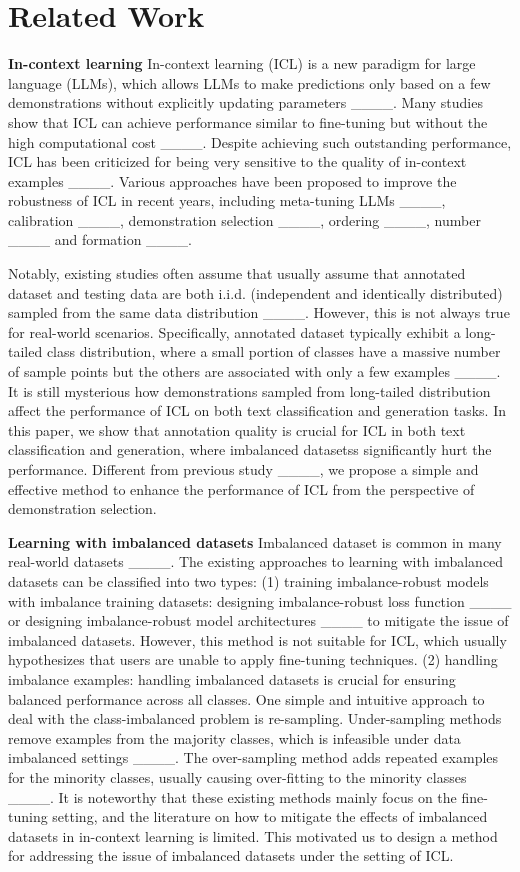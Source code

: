 \section{Related Work}
\textbf{In-context learning} In-context learning (ICL) is a new paradigm for large language (LLMs), which allows LLMs to make predictions only based on a few demonstrations without explicitly updating parameters ____. Many studies show that ICL can achieve performance similar to fine-tuning but without the high computational cost ____. Despite achieving such outstanding performance, ICL has been criticized for being very sensitive to the quality of in-context examples ____. Various approaches have been proposed to improve the robustness of ICL in recent years, including meta-tuning LLMs ____, calibration ____,  demonstration selection ____, ordering ____, number ____ and formation ____.  

Notably, existing studies often assume that usually assume that annotated dataset and testing data are both i.i.d. (independent and identically distributed) sampled from the same data distribution ____. However, this is not always true for real-world scenarios. Specifically, annotated dataset typically exhibit a long-tailed class distribution, where a small portion of classes have a massive number of sample points but the others are associated with only a few examples ____. It is still mysterious how demonstrations sampled from long-tailed distribution affect the performance of ICL on both text classification and generation tasks. In this paper, we show that annotation quality is crucial for ICL in both text classification and generation, where imbalanced datasetss significantly hurt the performance. Different from previous study ____,  we propose a simple and effective method to enhance the performance of ICL from the perspective of demonstration selection.


\textbf{Learning with imbalanced datasets} Imbalanced dataset is common in many real-world datasets ____. 
The existing approaches to learning with imbalanced datasets can be classified into two types: (1) training imbalance-robust models with imbalance training datasets: designing imbalance-robust loss function ____ or designing imbalance-robust model architectures ____ to mitigate the issue of imbalanced datasets. However, this method is not suitable for ICL, which usually hypothesizes that users are unable to apply fine-tuning techniques. (2) handling imbalance examples: handling imbalanced datasets is crucial for ensuring balanced performance across all classes. One simple and intuitive approach to deal with the class-imbalanced problem is re-sampling. Under-sampling methods remove examples from the majority classes, which is infeasible under data imbalanced settings ____. The over-sampling method adds repeated examples for the minority classes, usually causing over-fitting to the minority classes ____. It is noteworthy that these existing methods mainly focus on the fine-tuning setting, and the literature on how to mitigate the effects of imbalanced datasets in in-context learning is limited. This motivated us to design a method for addressing the issue of imbalanced datasets under the setting of ICL.


%